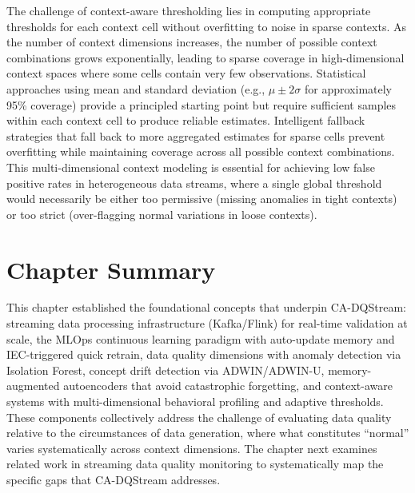 The challenge of context-aware thresholding lies in computing appropriate thresholds for each context cell without overfitting to noise in sparse contexts. As the number of context dimensions increases, the number of possible context combinations grows exponentially, leading to sparse coverage in high-dimensional context spaces where some cells contain very few observations. Statistical approaches using mean and standard deviation (e.g., $\mu \pm 2\sigma$ for approximately 95\% coverage) provide a principled starting point but require sufficient samples within each context cell to produce reliable estimates. Intelligent fallback strategies that fall back to more aggregated estimates for sparse cells prevent overfitting while maintaining coverage across all possible context combinations. This multi-dimensional context modeling is essential for achieving low false positive rates in heterogeneous data streams, where a single global threshold would necessarily be either too permissive (missing anomalies in tight contexts) or too strict (over-flagging normal variations in loose contexts).

\section{Chapter Summary}

This chapter established the foundational concepts that underpin CA-DQStream: streaming data processing infrastructure (Kafka/Flink) for real-time validation at scale, the MLOps continuous learning paradigm with auto-update memory and IEC-triggered quick retrain, data quality dimensions with anomaly detection via Isolation Forest, concept drift detection via ADWIN/ADWIN-U, memory-augmented autoencoders that avoid catastrophic forgetting, and context-aware systems with multi-dimensional behavioral profiling and adaptive thresholds. These components collectively address the challenge of evaluating data quality relative to the circumstances of data generation, where what constitutes ``normal'' varies systematically across context dimensions. The chapter next examines related work in streaming data quality monitoring to systematically map the specific gaps that CA-DQStream addresses.
